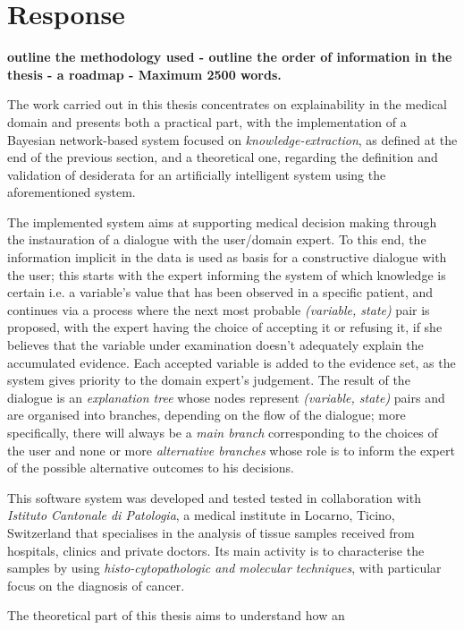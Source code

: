 
\section{Response} \label{sec:response}
\textbf{outline the methodology used - 
outline the order of information in the thesis - a roadmap - Maximum 2500 words.}

The work carried out in this thesis concentrates on explainability in the medical domain and presents both a practical part, with the implementation of a Bayesian network-based system focused on \textit{knowledge-extraction}, as defined at the end of the previous section, and a theoretical one, regarding the definition and validation of desiderata for an artificially intelligent system using the aforementioned system.

The implemented system aims at supporting medical decision making through the instauration of a dialogue with the user/domain expert.  To this end, the information implicit in the data is used as basis for a constructive dialogue with the user; this starts with the expert informing the system of which knowledge is certain i.e. a variable's value that has been observed in a specific patient, and continues via a process where the next most probable \textit{(variable, state)} pair is proposed, with the expert having the choice of accepting it or refusing it, if she believes that the variable under examination doesn't adequately explain the accumulated evidence.  Each accepted variable is added to the evidence set, as the system gives priority to the domain expert's judgement.
The result of the dialogue is an \textit{explanation tree} whose nodes represent \textit{(variable, state)} pairs and are organised into branches, depending on the flow of the dialogue; more specifically, there will always be a \textit{main branch} corresponding to the choices of the user and none or more \textit{alternative branches} whose role is to inform the expert of the possible alternative outcomes to his decisions.

This software system was developed and tested tested in collaboration with \textit{Istituto Cantonale di Patologia}, a medical institute in Locarno, Ticino, Switzerland that specialises in the analysis of tissue samples received from hospitals, clinics and private doctors.  Its main activity is to characterise the samples by using \textit{histo-cytopathologic and molecular techniques}, with particular focus on the diagnosis of cancer.

The theoretical part of this thesis aims to understand how an  